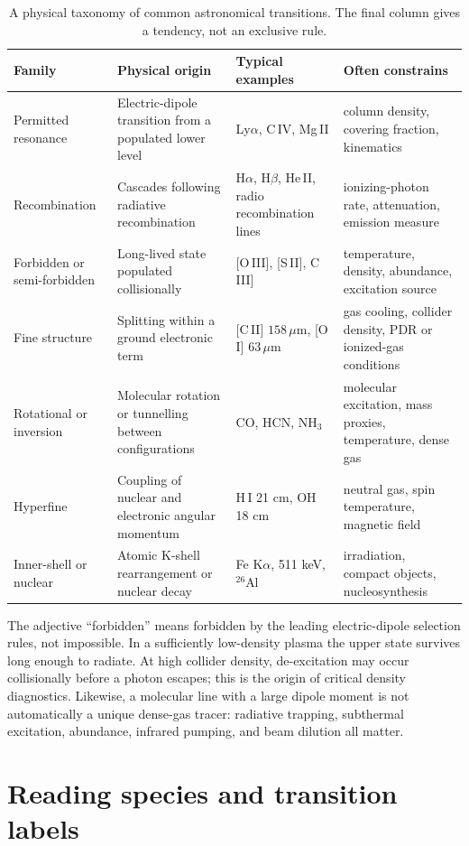 \begin{table}[tbp]
\centering
\caption{A physical taxonomy of common astronomical transitions.  The final
column gives a tendency, not an exclusive rule.}
\label{tab:transition-families}
\small
\begin{tabularx}{\textwidth}{@{}lXX X@{}}
\toprule
Family & Physical origin & Typical examples & Often constrains \\
\midrule
Permitted resonance & Electric-dipole transition from a populated lower level &
Ly$\alpha$, C\,IV, Mg\,II & column density, covering fraction, kinematics \\
Recombination & Cascades following radiative recombination &
H$\alpha$, H$\beta$, He\,II, radio recombination lines & ionizing-photon rate,
attenuation, emission measure \\
Forbidden or semi-forbidden & Long-lived state populated collisionally &
[O\,III], [S\,II], C\,III] & temperature, density, abundance, excitation source \\
Fine structure & Splitting within a ground electronic term &
[C\,II] $158\,\mu$m, [O\,I] $63\,\mu$m & gas cooling, collider density, PDR or
ionized-gas conditions \\
Rotational or inversion & Molecular rotation or tunnelling between configurations &
CO, HCN, NH$_3$ & molecular excitation, mass proxies, temperature, dense gas \\
Hyperfine & Coupling of nuclear and electronic angular momentum &
H\,I 21 cm, OH 18 cm & neutral gas, spin temperature, magnetic field \\
Inner-shell or nuclear & Atomic K-shell rearrangement or nuclear decay &
Fe K$\alpha$, 511 keV, $^{26}$Al & irradiation, compact objects, nucleosynthesis \\
\bottomrule
\end{tabularx}
\end{table}

The adjective ``forbidden'' means forbidden by the leading electric-dipole
selection rules, not impossible.  In a sufficiently low-density plasma the upper
state survives long enough to radiate.  At high collider density, de-excitation
may occur collisionally before a photon escapes; this is the origin of critical
density diagnostics.  Likewise, a molecular line with a large dipole moment is
not automatically a unique dense-gas tracer: radiative trapping, subthermal
excitation, abundance, infrared pumping, and beam dilution all matter.

\section{Reading species and transition labels}

